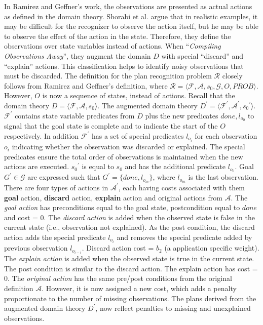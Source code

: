 In Ramirez and Geffner's work, the observations are presented as actual actions as defined in the domain theory. Shorabi et al. argue that in realistic examples, it may be difficult for the recognizer to observe the action itself, but he may be able to observe the effect of the action in the state. Therefore, they define the observations over state variables instead of actions. When  ``\textit{Compiling Observations Away}'', they augment the domain $D$ with special ``discard'' and ``explain'' actions. This classification helps to identify noisy observations that must be discarded. The definition for the plan recognition problem $\mathcal{R}$ closely follows from Ramirez and Geffner's definition, where $\mathcal{R}=\langle \mathcal{F}, \mathcal{A}, s_0, \mathcal{G}, O, PROB\rangle$. However, $O$ is now a sequence of states, instead of actions. Recall that the domain theory $D=\langle \mathcal{F}, \mathcal{A}, s_0 \rangle$. The augmented domain theory $D^\prime=\langle \mathcal{F}^\prime, \mathcal{A}^\prime, {s_0}^\prime\rangle$. $\mathcal{F}^\prime$ contains state variable predicates from $D$ plus the new predicates  $done, l_{o_0}$ to signal that the goal state is complete and to indicate the start of the $O$ respectively. 
In addition  $\mathcal{F}^\prime$ has a set of special predicates $l_{o_i}$ for each observation $o_i$ indicating whether the observation was discarded or explained. 
The special predicates ensure the total order of observations is maintained when the new actions are executed. 
${s_0}^\prime$ is equal to $s_0$ and has the additional predicate $l_{o_0}$. Goal $G^\prime \in \mathcal{G}$ are expressed such that $G^\prime = \lbrace done, l_{o_m}\rbrace$, where $l_{o_m}$ is the last observation. There are four types of actions in $\mathcal{A^\prime}$, each having costs associated with them \textbf{goal} action, \textbf{discard} action, \textbf{explain} action and original actions from $\mathcal{A}$. The \textit{goal action} has preconditions equal to the goal state, postcondition equal to $done$ and cost = 0. The \textit{discard action} is added when the observed state is false in the current state (i.e., observation not explained). As the post condition, the discard action adds the special predicate $l_{o_i}$ and removes the special predicate added by previous observation $l_{o_{i-i}}$. Discard action cost = $b_2$ (a application specific weight). The \textit{explain action} is added when the observed state is true in the current state. The post condition is similar to the discard action. The explain action has cost = 0. The \textit{original action} has the same pre/post conditions from the original definition $\mathcal{A}$. However, it is now assigned a new cost, which adds a penalty proportionate to the number of missing observations. The plans derived from the augmented domain theory $D^\prime$, now reflect penalties to missing and unexplained observations.

